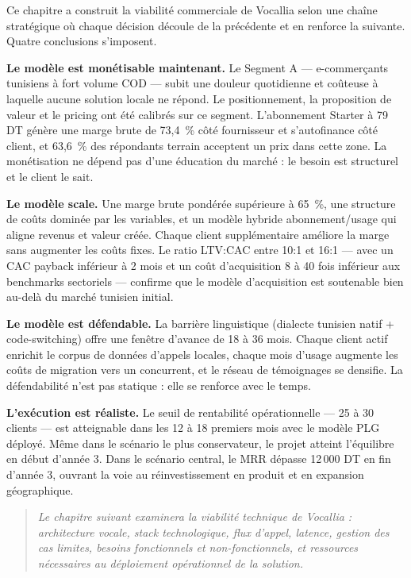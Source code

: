 Ce chapitre a construit la viabilité commerciale de Vocallia selon une chaîne stratégique où chaque décision découle de la précédente et en renforce la suivante. Quatre conclusions s'imposent.

\textbf{Le modèle est monétisable maintenant.} Le Segment A --- e-commerçants tunisiens à fort volume COD --- subit une douleur quotidienne et coûteuse à laquelle aucune solution locale ne répond. Le positionnement, la proposition de valeur et le pricing ont été calibrés sur ce segment. L'abonnement Starter à 79 DT génère une marge brute de 73,4~\% côté fournisseur et s'autofinance côté client, et 63,6~\% des répondants terrain acceptent un prix dans cette zone. La monétisation ne dépend pas d'une éducation du marché : le besoin est structurel et le client le sait.

\textbf{Le modèle scale.} Une marge brute pondérée supérieure à 65~\%, une structure de coûts dominée par les variables, et un modèle hybride abonnement/usage qui aligne revenus et valeur créée. Chaque client supplémentaire améliore la marge sans augmenter les coûts fixes. Le ratio LTV:CAC entre 10:1 et 16:1 --- avec un CAC payback inférieur à 2 mois et un coût d'acquisition 8 à 40 fois inférieur aux benchmarks sectoriels --- confirme que le modèle d'acquisition est soutenable bien au-delà du marché tunisien initial.

\textbf{Le modèle est défendable.} La barrière linguistique (dialecte tunisien natif + code-switching) offre une fenêtre d'avance de 18 à 36 mois. Chaque client actif enrichit le corpus de données d'appels locales, chaque mois d'usage augmente les coûts de migration vers un concurrent, et le réseau de témoignages se densifie. La défendabilité n'est pas statique : elle se renforce avec le temps.

\textbf{L'exécution est réaliste.} Le seuil de rentabilité opérationnelle --- 25 à 30 clients --- est atteignable dans les 12 à 18 premiers mois avec le modèle PLG déployé. Même dans le scénario le plus conservateur, le projet atteint l'équilibre en début d'année 3. Dans le scénario central, le MRR dépasse 12\,000 DT en fin d'année 3, ouvrant la voie au réinvestissement en produit et en expansion géographique.

\begin{quote}
\textit{Le chapitre suivant examinera la viabilité technique de Vocallia : architecture vocale, stack technologique, flux d'appel, latence, gestion des cas limites, besoins fonctionnels et non-fonctionnels, et ressources nécessaires au déploiement opérationnel de la solution.}
\end{quote}